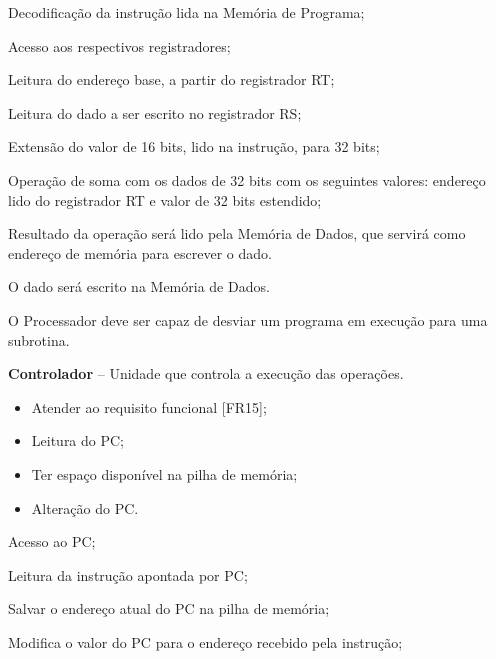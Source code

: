 \documentclass{article}
\begin{document}
  
  \begin{mainflow}
    \item Decodificação da instrução lida na Memória de Programa;
	\item Acesso aos respectivos registradores;
	\item Leitura do endereço base, a partir do registrador RT;
	\item Leitura do dado a ser escrito no registrador RS;
	\item Extensão do valor de 16 bits, lido na instrução, para 32 bits;
	\item Operação de soma com os dados de 32 bits com os seguintes valores: endereço lido do registrador RT e valor de 32 bits estendido;
	\item Resultado da operação será lido pela Memória de Dados, que servirá como endereço de memória para escrever o dado.
	\item O dado será escrito na Memória de Dados.
  \end{mainflow}
  
	O Processador deve ser capaz de desviar um programa em execução para uma subrotina.
	
	\actors
	\begin{description}
		\item \textbf{Controlador} – Unidade que controla a execução das operações.
	\end{description}
	
	\preconditions 
	\begin{itemize}
		\item Atender ao requisito funcional [FR15];
		\item Leitura do PC;
		\item Ter espaço disponível na pilha de memória;
	\end{itemize}
	
	\postconditions
	\begin{itemize}
		\item Alteração do PC.
	\end{itemize}

	\newpage
	
	
	\begin{mainflow}
		\item Acesso ao PC;
		\item Leitura da instrução apontada por PC;
		\item Salvar o endereço atual do PC na pilha de memória;
		\item Modifica o valor do PC para o endereço recebido pela instrução;
	\end{mainflow}
  
\end{document}
